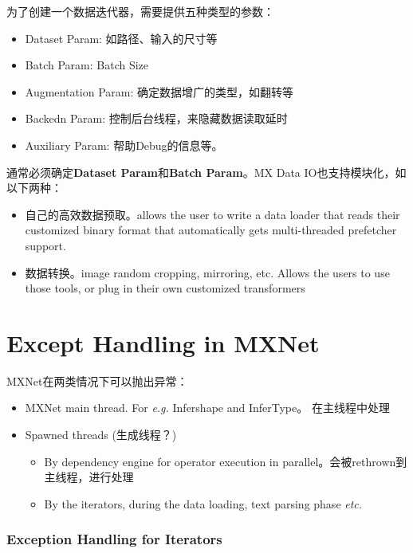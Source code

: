 为了创建一个数据迭代器，需要提供五种类型的参数：

\begin{itemize}
\item Dataset Param: 如路径、输入的尺寸等
\item Batch Param: Batch Size
\item Augmentation Param: 确定数据增广的类型，如翻转等
\item Backedn Param:  控制后台线程，来隐藏数据读取延时
\item Auxiliary Param: 帮助Debug的信息等。
\end{itemize}

通常必须确定\textbf{Dataset Param}和\textbf{Batch Param}。MX Data IO也支持模块化，如以下两种：
\begin{itemize}
\item 自己的高效数据预取。allows the user to write a data loader that reads their customized binary format that automatically gets multi-threaded prefetcher support.

\item 数据转换。image random cropping, mirroring, etc. Allows the users to use those tools, or plug in their own customized transformers

\end{itemize}


\section{Except Handling in MXNet}

MXNet在两类情况下可以抛出异常：
\begin{itemize}
\item MXNet main thread. For \textit{e.g.} Infershape and InferType。 在主线程中处理
\item Spawned threads (生成线程？)
\begin{itemize}
\item By dependency engine for operator execution in parallel。会被rethrown到主线程，进行处理
\item By the iterators, during the data loading, text parsing phase \textit{etc.}
\end{itemize}
\end{itemize}

\subsubsection{Exception Handling for Iterators}


